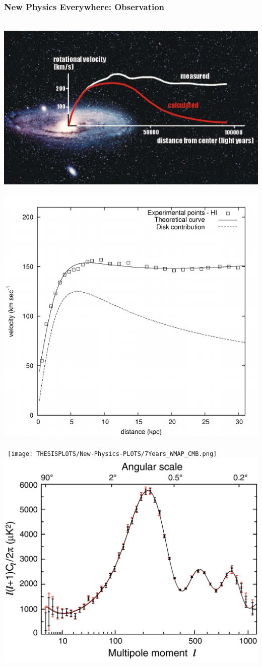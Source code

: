 \documentclass{beamer}
\begin{document}
\begin{frame}
\frametitle{New Physics Everywhere: Observation}
\begin{minipage}[t]{0.80\paperwidth}
 \begin{tcolorbox}[colback=UNL@Cream!5,colframe=UNL@Cream!60,title=\textcolor{UMN@Maroon}{\textbf{Dark Matter.}}]
    \mbox{ 
       \includegraphics[height=0.40\linewidth,width=0.5\linewidth]{THESISPLOTS/New-Physics-PLOTS/DMRotationcurve.jpg}          
       \includegraphics[height=0.40\linewidth,width=0.5\linewidth]{THESISPLOTS/New-Physics-PLOTS/DM-Rotation-Curves.png} 
          }\\
     \mbox{            
\texttt{[image: THESISPLOTS/New-Physics-PLOTS/7Years\_WMAP\_CMB.png]} \\
 \includegraphics[height=0.35\linewidth,width=0.5\linewidth]{THESISPLOTS/New-Physics-PLOTS/CMB_Multiple_Moments.png} 
 } 
\end{tcolorbox}
\end{minipage}
\end{frame}
\end{document}
